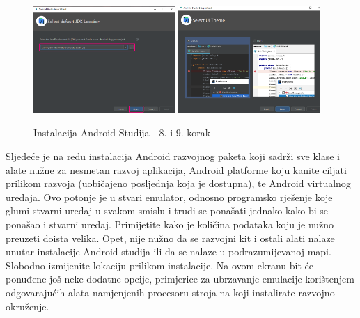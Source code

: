 \documentclass[11pt,a4paper,twoside]{article}
\begin{document}
	\begin{figure}[!h]
		\centering
		\includegraphics[width=0.48\textwidth]{install_08.png}
		\hfill
		\includegraphics[width=0.48\textwidth]{install_09.png}
		\caption{Instalacija Android Studija - 8. i 9. korak}
		\label{fig:install_08}	
	\end{figure}

	Sljedeće je na redu instalacija Android razvojnog paketa koji sadrži sve klase i alate nužne za nesmetan razvoj aplikacija, Android platforme koju kanite ciljati prilikom razvoja (uobičajeno posljednja koja je dostupna), te Android virtualnog uređaja. Ovo potonje je u stvari emulator, odnosno programsko rješenje koje glumi stvarni uređaj u svakom smislu i trudi se ponašati jednako kako bi se ponašao i stvarni uređaj. Primijetite kako je količina podataka koju je nužno preuzeti doista velika. Opet, nije nužno da se razvojni kit i ostali alati nalaze unutar instalacije Android studija ili da se nalaze u podrazumijevanoj mapi. Slobodno izmijenite lokaciju prilikom instalacije. Na ovom ekranu bit će ponuđene još neke dodatne opcije, primjerice za ubrzavanje emulacije korištenjem odgovarajućih alata namjenjenih procesoru stroja na koji instalirate razvojno okruženje.
\end{document}
